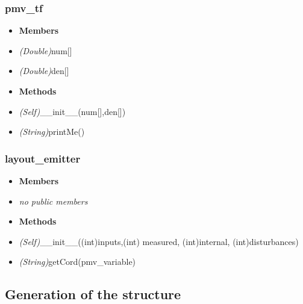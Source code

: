 \documentclass{report}
\begin{document}
\subsubsection{pmv\_tf}
\begin{itemize}[label=]
\item \textbf{Members}
\end{itemize}
\begin{itemize}[label=\_\_]
\item\textit{(Double)}num[]
\item\textit{(Double)}den[]



\end{itemize}
\begin{itemize}[label=]
\item \textbf{Methods}
\end{itemize}
\begin{itemize}[label=+]
\item\textit{(Self)}\_\_init\_\_(num[],den[])
\item\textit{(String)}printMe()
\end{itemize}

\subsubsection{layout\_emitter}
\begin{itemize}[label=]
\item \textbf{Members}
\end{itemize}
\begin{itemize}[label=-]
\item\textit{no public members}




\end{itemize}
\begin{itemize}[label=]
\item \textbf{Methods}
\end{itemize}
\begin{itemize}[label=+]
\item\textit{(Self)}\_\_init\_\_((int)inputs,(int) measured, (int)internal, (int)disturbances)

\item\textit{(String)}getCord(pmv\_variable)
\end{itemize}
\subsection{Generation of the structure}
\end{document}
